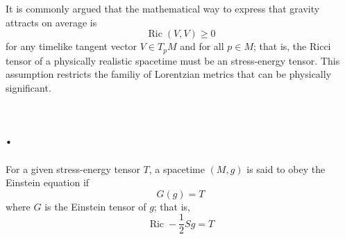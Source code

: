 It is commonly argued that the mathematical way to express that gravity attracts on average is
\begin{equation}
	\operatorname{Ric} (V,V) \geq 0
\end{equation}
for any timelike tangent vector $V \in T_p M$ and for all $p \in M$; that is, the Ricci tensor of a physically realistic spacetime must be an stress-energy tensor. This assumption restricts the familiy of Lorentzian metrics that can be physically significant.

\section{.}

For a given stress-energy tensor $T$, a spacetime $(M,g)$ is said to obey the Einstein equation if
\begin{equation}
	G(g) = T
\end{equation}
where $G$ is the Einstein tensor of $g$; that is,
\begin{equation}
	\operatorname{Ric} - \frac{1}{2} S g = T
\end{equation}